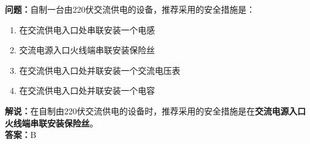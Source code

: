 \textbf{问题：}自制一台由220伏交流供电的设备，推荐采用的安全措施是：
\begin{enumerate}[label=\Alph*), leftmargin=1.5cm]
	\item 在交流供电入口处串联安装一个电感
	\item 交流电源入口火线端串联安装保险丝
	\item 在交流供电入口处并联安装一个交流电压表
	\item 在交流供电入口处并联安装一个电容
\end{enumerate}
\textbf{解说：}在自制由220伏交流供电的设备时，推荐采用的安全措施是在\textbf{交流电源入口火线端串联安装保险丝}。\\\textbf{答案：}B

